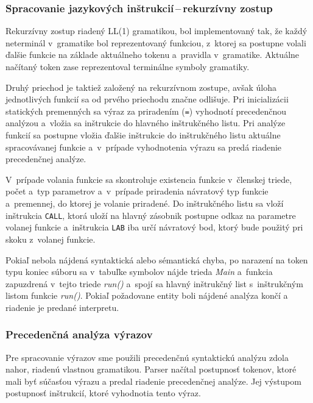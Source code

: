 \documentclass[11pt,a4paper]{article}
\begin{document}
	
	
	\subsubsection{Spracovanie jazykových inštrukcií\,--\,rekurzívny zostup}
	\label{rekurzia}
	Rekurzívny zostup riadený LL(1) gramatikou, bol implementovaný tak, že každý
	neterminál v~gramatike bol reprezentovaný funkciou, z~ktorej sa postupne
	volali ďalšie funkcie na základe aktuálneho tokenu a~pravidla v~gramatike.
	Aktuálne načítaný token zase reprezentoval terminálne symboly gramatiky.
	
	Druhý priechod je taktiež založený na rekurzívnom zostupe, avšak úloha
	jednotlivých funkcií sa od prvého priechodu značne odlišuje.
	Pri inicializácii statických premenných sa výraz za priradením (\texttt{=})
	vyhodnotí precedenčnou analýzou a~vložia sa inštrukcie do hlavného
	inštrukčného listu. Pri analýze funkcií sa postupne vložia ďalšie inštrukcie
	do inštrukčného listu aktuálne spracovávanej funkcie a~v~prípade vyhodnotenia
	výrazu  sa predá riadenie precedenčnej analýze.
	
	V~prípade volania funkcie sa skontroluje existencia funkcie v~členskej
	triede, počet a~typ parametrov a~v~prípade priradenia  návratový typ
	funkcie a~premennej, do ktorej je volanie priradené. Do inštrukčného
	listu sa vloží inštrukcia \texttt{CALL}, ktorá uloží na hlavný zásobnik
	postupne odkaz na parametre volanej funkcie a~inštrukcia \texttt{LAB}
	iba určí návratový bod, ktorý bude použitý pri skoku z~volanej funkcie.
	
	Pokiaľ nebola nájdená syntaktická alebo sémantická chyba, po narazení na
	token typu koniec súboru sa v~tabuľke symbolov nájde trieda \emph{Main}
	a~funkcia zapuzdrená v~tejto triede \emph{run()} a~spojí sa hlavný inštrukčný
	list s~inštrukčným listom funkcie \emph{run()}. Pokiaľ požadovane entity
	boli nájdené analýza končí a riadenie je predané interpretu.
	
	\subsubsection{Precedenčná analýza výrazov}
	\label{precedencna analyza}
	
	Pre spracovanie výrazov sme použili precedenčnú syntaktickú analýzu zdola nahor,
	riadenú vlastnou gramatikou.
	Parser načítal postupnosť tokenov, ktoré mali byť súčasťou výrazu a predal
	riadenie precedenčnej analýze. Jej výstupom postupnosť inštrukcií, ktoré vyhodnotia tento výraz.
	
\end{document}
